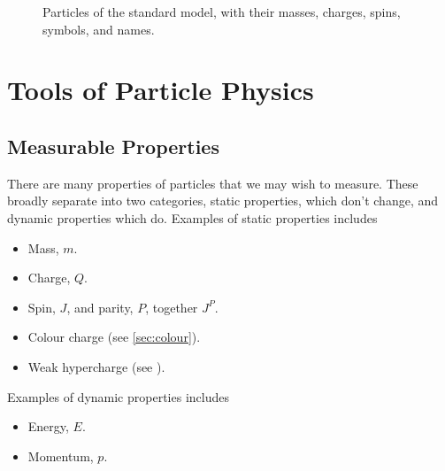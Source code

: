 \documentclass[fleqn]{NotesClass}
\begin{document}
\begin{figure}
        \caption[The standard model.]{Particles of the standard model, with their masses, charges, spins, symbols, and names.}
    \end{figure}
    
    \chapter{Tools of Particle Physics}
    \section{Measurable Properties}
    There are many properties of particles that we may wish to measure.
    These broadly separate into two categories, static properties, which don't change, and dynamic properties which do.
    Examples of static properties includes
    \begin{itemize}
        \item Mass, \(m\).
        \item Charge, \(Q\).
        \item Spin, \(J\), and parity, \(P\), together \(J^P\).
        \item Colour charge (see \cref{sec:colour}).
        \item Weak hypercharge (see ). %
    \end{itemize}
    Examples of dynamic properties includes
    \begin{itemize}
        \item Energy, \(E\).
        \item Momentum, \(p\).
    \end{itemize}
    
\end{document}
